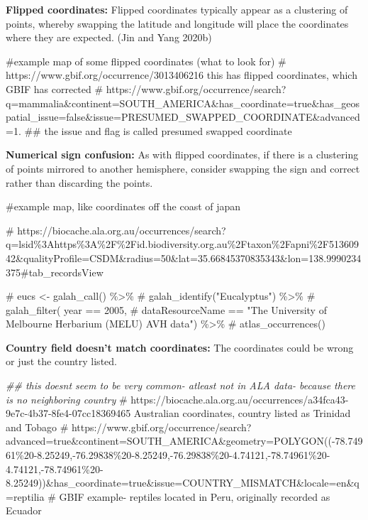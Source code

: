 \documentclass[
  letterpaper,
  DIV=11,
  numbers=noendperiod,
  oneside]{scrreprt}
\newenvironment{Shaded}{\begin{snugshade}}{\end{snugshade}}
\newcommand{\CommentTok}[1]{\textcolor[rgb]{0.37,0.37,0.37}{#1}}
\newcommand{\DocumentationTok}[1]{\textcolor[rgb]{0.37,0.37,0.37}{\textit{#1}}}
\begin{document}
\textbf{Flipped coordinates:} Flipped coordinates typically appear as a
clustering of points, whereby swapping the latitude and longitude will
place the coordinates where they are expected. (Jin and Yang 2020b)

\begin{Shaded}
\begin{Highlighting}[]
\CommentTok{\#example map of some flipped coordinates (what to look for) }
\CommentTok{\# https://www.gbif.org/occurrence/3013406216 this has flipped coordinates, which GBIF has corrected}
\CommentTok{\# https://www.gbif.org/occurrence/search?q=mammalia\&continent=SOUTH\_AMERICA\&has\_coordinate=true\&has\_geospatial\_issue=false\&issue=PRESUMED\_SWAPPED\_COORDINATE\&advanced=1. \#\# the issue and flag is called \textquotesingle{}presumed swapped coordinate\textquotesingle{} }
\end{Highlighting}
\end{Shaded}

\textbf{Numerical sign confusion:} As with flipped coordinates, if there
is a clustering of points mirrored to another hemisphere, consider
swapping the sign and correct rather than discarding the points.

\begin{Shaded}
\begin{Highlighting}[]
\CommentTok{\#example map, like coordinates off the coast of japan}

\CommentTok{\# https://biocache.ala.org.au/occurrences/search?q=lsid\%3Ahttps\%3A\%2F\%2Fid.biodiversity.org.au\%2Ftaxon\%2Fapni\%2F51360942\&qualityProfile=CSDM\&radius=50\&lat=35.66845370835343\&lon=138.9990234375\#tab\_recordsView}

\CommentTok{\# eucs \textless{}{-} galah\_call() \%\textgreater{}\% }
\CommentTok{\#  galah\_identify("Eucalyptus") \%\textgreater{}\%}
\CommentTok{\#  galah\_filter( year == 2005, }
\CommentTok{\#             dataResourceName == "The University of Melbourne Herbarium (MELU) AVH data") \%\textgreater{}\%}
\CommentTok{\#  atlas\_occurrences()}
\end{Highlighting}
\end{Shaded}

\textbf{Country field doesn't match coordinates:} The coordinates could
be wrong or just the country listed.

\begin{Shaded}
\begin{Highlighting}[]
\DocumentationTok{\#\# this doesnt seem to be very common{-} atleast not in ALA data{-} because there is no neighboring country}
\CommentTok{\# https://biocache.ala.org.au/occurrences/a34fca43{-}9e7c{-}4b37{-}8fe4{-}07cc18369465 Australian coordinates, country listed as Trinidad and Tobago}
\CommentTok{\# https://www.gbif.org/occurrence/search?advanced=true\&continent=SOUTH\_AMERICA\&geometry=POLYGON(({-}78.74961\%20{-}8.25249,{-}76.29838\%20{-}8.25249,{-}76.29838\%20{-}4.74121,{-}78.74961\%20{-}4.74121,{-}78.74961\%20{-}8.25249))\&has\_coordinate=true\&issue=COUNTRY\_MISMATCH\&locale=en\&q=reptilia   \# GBIF example{-} reptiles located in Peru, originally recorded as Ecuador}
\end{Highlighting}
\end{Shaded}
\end{document}
